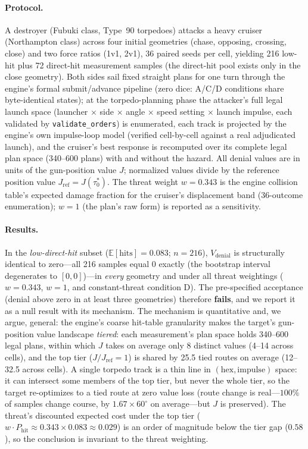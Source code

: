 \documentclass[12pt,a4paper]{article}
\begin{document}
\paragraph{Protocol.}  A destroyer (Fubuki class, Type~90 torpedoes) attacks a
heavy cruiser (Northampton class) across four initial geometries
(chase, opposing, crossing, close) and two force ratios (1v1, 2v1),
36 paired seeds per cell, yielding 216 low-hit plus 72 direct-hit
measurement samples (the direct-hit pool exists only in the close
geometry).  Both sides sail fixed
straight plans for one turn through the engine's formal
submit/advance pipeline (zero dice: A/C/D conditions share byte-identical
states); at the torpedo-planning phase the attacker's full legal launch
space (launcher $\times$ side $\times$ angle $\times$ speed setting $\times$
launch impulse, each validated by \texttt{validate\_orders}) is enumerated,
each track is projected by the engine's own impulse-loop model (verified
cell-by-cell against a real adjudicated launch), and the cruiser's best
response is recomputed over its complete legal plan space
(340--600 plans) with and without the hazard.  All denial values are in units of the gun-position value $J$; normalized values divide by the reference position value $J_{\text{ref}}=J(\tau_0^*)$.  The threat weight $w=0.343$
is the engine collision table's expected damage fraction for the cruiser's
displacement band (36-outcome enumeration); $w=1$ (the plan's raw form) is
reported as a sensitivity.

\paragraph{Results.}  In the \emph{low-direct-hit} subset
($\mathbb{E}[\text{hits}] = 0.083$; $n=216$), $V_{\text{denial}}$ is
structurally identical to zero---all 216 samples equal $0$ exactly (the
bootstrap interval degenerates to $[0,0]$)---in \emph{every} geometry and
under all threat weightings ($w=0.343$, $w=1$, and constant-threat
condition D).  The pre-specified acceptance (denial above zero in at least
three geometries) therefore \textbf{fails}, and we report it as a null
result with its mechanism.  The mechanism is quantitative and, we argue,
general: the engine's coarse hit-table granularity makes the target's
gun-position value landscape \emph{tiered}: each measurement's plan space
holds 340--600 legal plans, within which $J$ takes on average only 8
distinct values (4--14 across cells), and the top tier
($J/J_{\text{ref}}=1$) is shared by 25.5 tied routes on average
(12--32.5 across cells).  A single torpedo track is a thin
line in $(\text{hex},\text{impulse})$ space: it can intersect some members
of the top tier, but never the whole tier, so the target re-optimizes to a
tied route at zero value loss (route change is real---$100\%$ of samples
change course, by $1.67\times60^{\circ}$ on average---but $J$ is preserved).
The threat's discounted expected cost under the top tier
($w\cdot P_{\text{hit}} \approx 0.343\times0.083 \approx 0.029$) is an order
of magnitude below the tier gap ($0.58$), so the conclusion is invariant to
the threat weighting.
\end{document}
